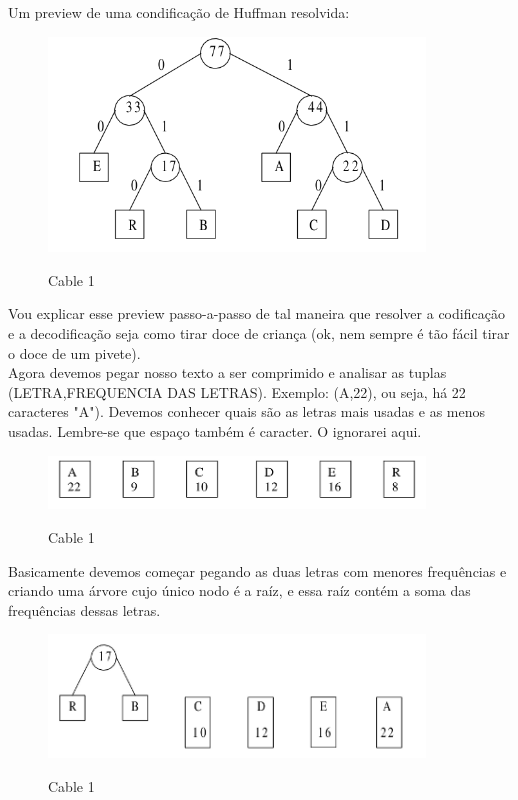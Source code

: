 \documentclass{article}
\begin{document}
Um preview de uma condificação de Huffman resolvida:

\begin{figure}[h]
    \center
    \includegraphics[width=10cm]{imagens/huffman.png}
    \label{cable}
    \caption{Cable 1}
\end{figure}

\newpage

Vou explicar esse preview passo-a-passo de tal maneira que resolver a codificação e a
decodificação seja como tirar doce de criança (ok, nem sempre é tão fácil tirar o doce de um
pivete).\\

Agora devemos pegar nosso texto a ser comprimido e analisar as tuplas (LETRA,FREQUENCIA DAS LETRAS).
Exemplo: (A,22), ou seja, há 22 caracteres "A"). Devemos conhecer quais são as letras mais usadas e as menos usadas. Lembre-se que espaço também é
caracter. O ignorarei aqui.\\

\begin{figure}[h]
    \center
    \includegraphics[width=10cm]{imagens/huffman2.png}
    \label{cable}
    \caption{Cable 1}
\end{figure}


Basicamente devemos começar pegando as duas letras com menores frequências e criando uma árvore cujo
único nodo é a raíz, e essa raíz contém a soma das frequências dessas letras.

\begin{figure}[h]
    \center
    \includegraphics[width=10cm]{imagens/huffman3.png}
    \label{cable}
    \caption{Cable 1}
\end{figure}
\end{document}
